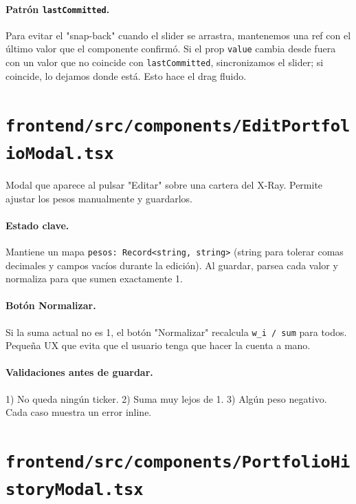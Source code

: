 \documentclass[11pt,a4paper]{book}
\begin{document}
\paragraph{Patrón \texttt{lastCommitted}.} Para evitar el "snap-back" cuando el slider se arrastra, mantenemos una ref con el último valor que el componente confirmó. Si el prop \texttt{value} cambia desde fuera con un valor que no coincide con \texttt{lastCommitted}, sincronizamos el slider; si coincide, lo dejamos donde está. Esto hace el drag fluido.

\section{\texttt{frontend/src/components/EditPortfolioModal.tsx}}

Modal que aparece al pulsar "Editar" sobre una cartera del X-Ray. Permite ajustar los pesos manualmente y guardarlos.

\paragraph{Estado clave.} Mantiene un mapa \texttt{pesos: Record<string, string>} (string para tolerar comas decimales y campos vacíos durante la edición). Al guardar, parsea cada valor y normaliza para que sumen exactamente 1.

\paragraph{Botón Normalizar.} Si la suma actual no es 1, el botón "Normalizar" recalcula \texttt{w\_i / sum} para todos. Pequeña UX que evita que el usuario tenga que hacer la cuenta a mano.

\paragraph{Validaciones antes de guardar.} 1) No queda ningún ticker. 2) Suma muy lejos de 1. 3) Algún peso negativo. Cada caso muestra un error inline.

\section{\texttt{frontend/src/components/PortfolioHistoryModal.tsx}}
\end{document}
